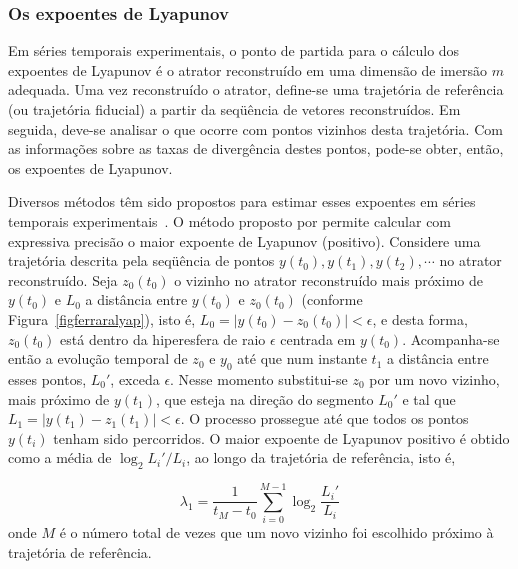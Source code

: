 \subsubsection{Os expoentes de Lyapunov}

Em séries temporais experimentais, o ponto de partida para o cálculo dos expoentes de Lyapunov é o atrator reconstruído em uma dimensão de imersão $m$ adequada. Uma vez reconstruído o atrator, define-se uma trajetória de referência (ou trajetória fiducial) a partir da seqüência de vetores reconstruídos. Em seguida, deve-se analisar o que ocorre com pontos vizinhos desta trajetória. Com as informações sobre as taxas de divergência destes pontos, pode-se obter, então, os expoentes de Lyapunov. 

Diversos métodos têm sido propostos para estimar esses expoentes em séries temporais experimentais~\cite{wolf/85,eckrue/86,sanosawada/85}. O método proposto por  permite calcular com expressiva precisão o maior expoente de Lyapunov (positivo). Considere uma trajetória descrita pela seqüência de pontos $y(t_0), y(t_1), y(t_2),\cdots$ no atrator reconstruído. Seja $z_0(t_0)$ o vizinho no atrator reconstruído mais próximo de $y(t_0)$ e $L_0$ a distância entre $y(t_0)$ e $z_0(t_0)$ (conforme Figura~\ref{figferraralyap}), isto é, $L_0=\left|y(t_0)-z_0(t_0)\right|<\epsilon$, e desta forma, $z_0(t_0)$ está dentro da hiperesfera de raio $\epsilon$ centrada em $y(t_0)$. Acompanha-se então a evolução temporal de $z_0$ e $y_0$ até que num instante $t_1$ a distância entre esses pontos, $L_0{'}$, exceda $\epsilon$. Nesse momento substitui-se $z_0$ por um novo vizinho, mais próximo de $y(t_1)$, que esteja na direção do segmento $L_0{'}$ e tal que $L_1=\left|y(t_1)-z_1(t_1)\right|<\epsilon$. O processo prossegue até que todos os pontos $y(t_i)$ tenham sido percorridos. O maior expoente de Lyapunov positivo é obtido como a média de $\log_{2} L_i{'}/L_i$, ao longo da trajetória de referência, isto é,

\begin{equation}
\lambda_{1}=\frac{1}{t_{M}-t_{0}}\sum_{i=0}^{M-1}\log_{2}\frac{L_i{'}}{L_i}
\label{lyap2}
\end{equation}
onde $M$ é o número total de vezes que um novo vizinho foi escolhido próximo à trajetória de referência.

